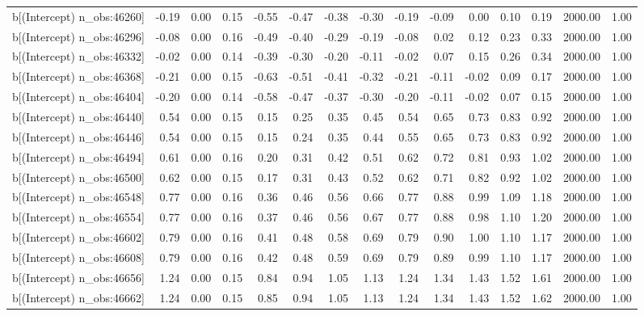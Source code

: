 \begin{table}[ht]
\begin{tabular}{rrrrrrrrrrrrrrr}
  b[(Intercept) n\_obs:46260] & -0.19 & 0.00 & 0.15 & -0.55 & -0.47 & -0.38 & -0.30 & -0.19 & -0.09 & 0.00 & 0.10 & 0.19 & 2000.00 & 1.00 \\ 
  b[(Intercept) n\_obs:46296] & -0.08 & 0.00 & 0.16 & -0.49 & -0.40 & -0.29 & -0.19 & -0.08 & 0.02 & 0.12 & 0.23 & 0.33 & 2000.00 & 1.00 \\ 
  b[(Intercept) n\_obs:46332] & -0.02 & 0.00 & 0.14 & -0.39 & -0.30 & -0.20 & -0.11 & -0.02 & 0.07 & 0.15 & 0.26 & 0.34 & 2000.00 & 1.00 \\ 
  b[(Intercept) n\_obs:46368] & -0.21 & 0.00 & 0.15 & -0.63 & -0.51 & -0.41 & -0.32 & -0.21 & -0.11 & -0.02 & 0.09 & 0.17 & 2000.00 & 1.00 \\ 
  b[(Intercept) n\_obs:46404] & -0.20 & 0.00 & 0.14 & -0.58 & -0.47 & -0.37 & -0.30 & -0.20 & -0.11 & -0.02 & 0.07 & 0.15 & 2000.00 & 1.00 \\ 
  b[(Intercept) n\_obs:46440] & 0.54 & 0.00 & 0.15 & 0.15 & 0.25 & 0.35 & 0.45 & 0.54 & 0.65 & 0.73 & 0.83 & 0.92 & 2000.00 & 1.00 \\ 
  b[(Intercept) n\_obs:46446] & 0.54 & 0.00 & 0.15 & 0.15 & 0.24 & 0.35 & 0.44 & 0.55 & 0.65 & 0.73 & 0.83 & 0.92 & 2000.00 & 1.00 \\ 
  b[(Intercept) n\_obs:46494] & 0.61 & 0.00 & 0.16 & 0.20 & 0.31 & 0.42 & 0.51 & 0.62 & 0.72 & 0.81 & 0.93 & 1.02 & 2000.00 & 1.00 \\ 
  b[(Intercept) n\_obs:46500] & 0.62 & 0.00 & 0.15 & 0.17 & 0.31 & 0.43 & 0.52 & 0.62 & 0.71 & 0.82 & 0.92 & 1.02 & 2000.00 & 1.00 \\ 
  b[(Intercept) n\_obs:46548] & 0.77 & 0.00 & 0.16 & 0.36 & 0.46 & 0.56 & 0.66 & 0.77 & 0.88 & 0.99 & 1.09 & 1.18 & 2000.00 & 1.00 \\ 
  b[(Intercept) n\_obs:46554] & 0.77 & 0.00 & 0.16 & 0.37 & 0.46 & 0.56 & 0.67 & 0.77 & 0.88 & 0.98 & 1.10 & 1.20 & 2000.00 & 1.00 \\ 
  b[(Intercept) n\_obs:46602] & 0.79 & 0.00 & 0.16 & 0.41 & 0.48 & 0.58 & 0.69 & 0.79 & 0.90 & 1.00 & 1.10 & 1.17 & 2000.00 & 1.00 \\ 
  b[(Intercept) n\_obs:46608] & 0.79 & 0.00 & 0.16 & 0.42 & 0.48 & 0.59 & 0.69 & 0.79 & 0.89 & 0.99 & 1.10 & 1.17 & 2000.00 & 1.00 \\ 
  b[(Intercept) n\_obs:46656] & 1.24 & 0.00 & 0.15 & 0.84 & 0.94 & 1.05 & 1.13 & 1.24 & 1.34 & 1.43 & 1.52 & 1.61 & 2000.00 & 1.00 \\ 
  b[(Intercept) n\_obs:46662] & 1.24 & 0.00 & 0.15 & 0.85 & 0.94 & 1.05 & 1.13 & 1.24 & 1.34 & 1.43 & 1.52 & 1.62 & 2000.00 & 1.00 \\ 

\end{tabular}
\end{table}
